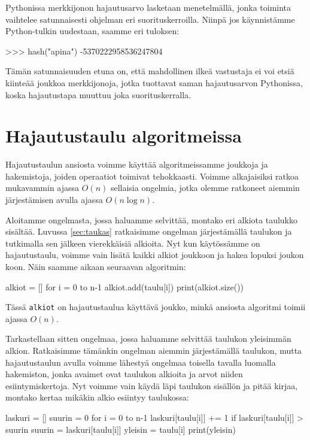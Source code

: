 Pythonissa merkkijonon hajautusarvo lasketaan menetelmällä,
jonka toiminta vaihtelee satunnaisesti ohjelman eri suorituskerroilla.
Niinpä jos käyn\-nistämme Python-tulkin uudestaan, saamme eri tuloksen:

\begin{code}
>>> hash("apina")
-5370222958536247804
\end{code}

Tämän satunnaisuuden etuna on, että mahdollinen ilkeä vastustaja
ei voi etsiä kiinteää joukkoa merkkijonoja, jotka tuottavat saman hajautusarvon
Pythonissa, koska hajautustapa muuttuu joka suorituskerralla.

\section{Hajautustaulu algoritmeissa}

Hajautustaulun ansiosta voimme käyttää algoritmeissamme
joukkoja ja hakemistoja, joiden operaatiot toimivat tehokkaasti.
Voimme alkajaisiksi ratkoa mukavammin ajassa $O(n)$ sellaisia ongelmia,
jotka olemme ratkoneet aiemmin järjestämisen avulla ajassa $O(n \log n)$.

Aloitamme ongelmasta, jossa haluamme selvittää,
montako eri alkiota taulukko sisältää.
Luvussa \ref{sec:taukas} ratkaisimme ongelman
järjestämällä taulukon ja tutkimalla sen jälkeen
vierekkäisiä alkioita.
Nyt kun käytös\-sämme on hajautustaulu, voimme vain lisätä
kaikki alkiot joukkoon ja hakea lopuksi joukon koon.
Näin saamme aikaan seuraavan algoritmin:

\begin{code}
alkiot = []
for i = 0 to n-1
    alkiot.add(taulu[i])
print(alkiot.size())
\end{code}

Tässä \texttt{alkiot} on hajautustaulua käyttävä joukko,
minkä ansiosta algoritmi toimii ajassa $O(n)$.

Tarkastellaan sitten ongelmaa, jossa haluamme selvittää
taulukon yleisimmän alkion.
Ratkaisimme tämänkin ongelman aiemmin
järjestä\-mällä taulukon, mutta
hajautustaulun avulla voimme lähestyä ongelmaa
toisella tavalla luomalla hakemiston,
jonka avaimet ovat taulukon alkioita ja arvot niiden
esiintymiskertoja.
Nyt voimme vain käydä läpi taulukon sisällön ja
pitää kirjaa, montako kertaa mikäkin alkio esiintyy taulukossa:

\begin{code}
laskuri = []
suurin = 0
for i = 0 to n-1
    laskuri[taulu[i]] += 1
    if laskuri[taulu[i]] > suurin
        suurin = laskuri[taulu[i]]
        yleisin = taulu[i]
print(yleisin)
\end{code}

